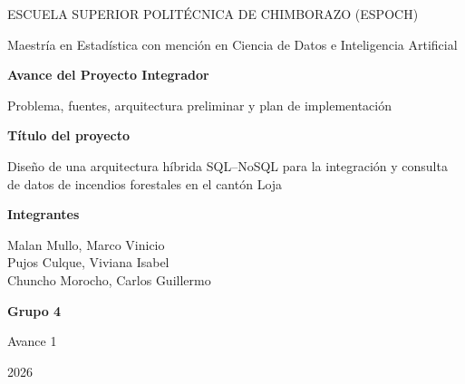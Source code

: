 \documentclass[11pt,a4paper]{article}
\begin{document}
\begin{titlepage}
\centering
\vspace*{1cm}

{\large ESCUELA SUPERIOR POLIT\'ECNICA DE CHIMBORAZO (ESPOCH)\par}
\vspace{0.3cm}
{\large Maestr\'ia en Estad\'istica con menci\'on en Ciencia de Datos e Inteligencia Artificial\par}

\vspace{2.5cm}
{\Huge\bfseries\color{myNewColorA} Avance del Proyecto Integrador\par}
\vspace{0.5cm}
{\large Problema, fuentes, arquitectura preliminar y plan de implementaci\'on\par}

\vspace{1.5cm}
\begin{minipage}{0.85\textwidth}
\centering
{\Large\bfseries T\'itulo del proyecto\par}
\vspace{0.3cm}
{\large Dise\~no de una arquitectura h\'ibrida SQL--NoSQL para la integraci\'on y consulta de datos de incendios forestales en el cant\'on Loja\par}
\end{minipage}

\vspace{2cm}
{\large\bfseries Integrantes\par}
\vspace{0.3cm}
{\large
Malan Mullo, Marco Vinicio \\
Pujos Culque, Viviana Isabel \\
Chuncho Morocho, Carlos Guillermo \par}

\vspace{2cm}
{\large\bfseries Grupo 4}\par

\vspace{1.5cm}
{\large Avance 1 \par}
{\large 2026 \par}

\vfill
\end{titlepage}

\tableofcontents
\thispagestyle{empty}
\newpage
\end{document}
